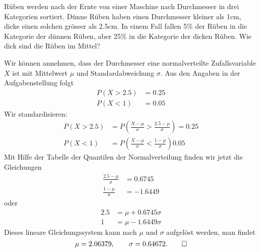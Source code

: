 Rüben werden nach der Ernte von einer Maschine nach Durchmesser
in drei Kategorien sortiert. Dünne Rüben haben einen Durchmesser
kleiner als 1cm, dicke einen solchen grösser als 2.5cm. In einem
Fall fallen 5\% der Rüben in die Kategorie der dünnen Rüben,
aber 25\% in die Kategorie der dicken Rüben. Wie dick sind
die Rüben im Mittel?


\begin{loesung}
Wir können annehmen, dass der Durchmesser eine normalverteilte
Zufallsvariable $X$ ist
mit Mittelwert $\mu$ und Standardabweichung $\sigma$. Aus den
Angaben in der Aufgabenstellung folgt
\begin{align*}
P(X>2.5)&= 0.25\\
P(X<1)&= 0.05
\end{align*}
Wir standardisieren:
\begin{align*}
P(X>2.5)&=P\left(
\frac{X-\mu}{\sigma}>\frac{2.5-\mu}{\sigma}
\right)=0.25
\\
P(X<1)&=P\left(
\frac{X-\mu}{\sigma}<\frac{1-\mu}{\sigma}
\right)0.05
\end{align*}
Mit Hilfe der Tabelle der Quantilen der Normalverteilung finden
wir jetzt die Gleichungen
\begin{align*}
\frac{2.5-\mu}{\sigma}&=0.6745
\\
\frac{1-\mu}{\sigma}&=-1.6449
\end{align*}
oder
\begin{align*}
2.5&=\mu+0.6745\sigma\\
1&=\mu-1.6449\sigma
\end{align*}
Dieses lineare Gleichungssystem kann nach $\mu$ und $\sigma$ aufgelöst
werden, man findet
\[
\mu=2.06379,\qquad
\sigma=0.64672.
\qedhere
\]
\end{loesung}

